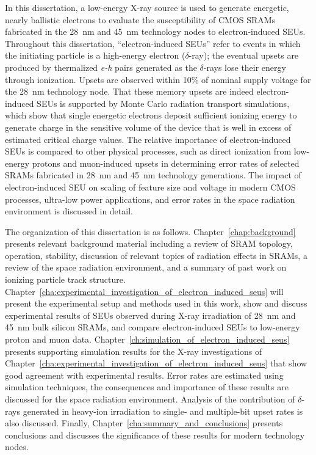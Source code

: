 In this dissertation, a low-energy X-ray source is used to generate energetic, nearly ballistic electrons to evaluate the susceptibility of CMOS SRAMs fabricated in the 28~nm and 45~nm technology nodes to electron-induced SEUs. 
Throughout this dissertation, ``electron-induced SEUs'' refer to events in which the initiating particle is a high-energy electron ($\delta$-ray); the eventual upsets are produced by thermalized \emph{e-h} pairs generated as the $\delta$-rays lose their energy through ionization. 
Upsets are observed within 10\% of nominal supply voltage for the 28~nm technology node. 
That these memory upsets are indeed electron-induced SEUs is supported by Monte Carlo radiation transport simulations, which show that single energetic electrons deposit sufficient ionizing energy to generate charge in the sensitive volume of the device that is well in excess of estimated critical charge values. 
The relative importance of electron-induced SEUs is compared to other physical processes, such as direct ionization from low-energy protons \cite{Rodbell:2007vl, Heidel:2008vf, Heidel:2009vx, Sierawski:2009ka} and muon-induced upsets \cite{Sierawski:2010cj, Sierawski:2011bn} in determining error rates of selected SRAMs fabricated in 28~nm and 45~nm technology generations. 
The impact of electron-induced SEU on scaling of feature size and voltage in modern CMOS processes, ultra-low power applications, and error rates in the space radiation environment is discussed in detail.

The organization of this dissertation is as follows. 
Chapter~\ref{chap:background} presents relevant background material including a review of SRAM topology, operation, stability, discussion of relevant topics of radiation effects in SRAMs, a review of the space radiation environment, and a summary of past work on ionizing particle track structure. 
Chapter~\ref{cha:experimental_investigation_of_electron_induced_seus} will present the experimental setup and methods used in this work, show and discuss experimental results of SEUs observed during X-ray irradiation of 28~nm and 45~nm bulk silicon SRAMs, and compare electron-induced SEUs to low-energy proton and muon data.
Chapter~\ref{ch:simulation_of_electron_induced_seus} presents supporting simulation results for the X-ray investigations of Chapter~\ref{cha:experimental_investigation_of_electron_induced_seus} that show good agreement with experimental results. Error rates are estimated using simulation techniques, the consequences and importance of these results are discussed for the space radiation environment.
Analysis of the contribution of $\delta$-rays generated in heavy-ion irradiation to single- and multiple-bit upset rates is also discussed.
Finally, Chapter~\ref{cha:summary_and_conclusions} presents conclusions and discusses the significance of these results for modern technology nodes.
